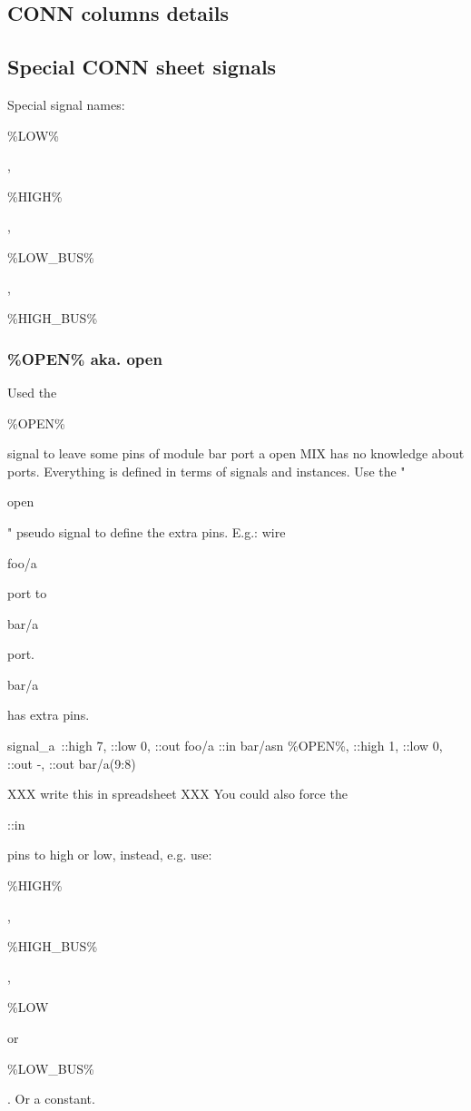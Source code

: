 \documentclass[a4paper,12pt]{article}
\begin{document}
\subsection{CONN columns details}

\subsection{Special CONN sheet signals}
Special signal names:\newline
\begin{tt}\%LOW\%\end{tt}, \begin{tt}\%HIGH\%\end{tt}, \begin{tt}\%LOW\_BUS\%\end{tt}, \begin{tt}\%HIGH\_BUS\%\end{tt}\newline

\subsubsection{\%OPEN\% aka. open}
Used the \begin{tt}\%OPEN\%\end{tt} signal to leave some pins of module bar port a open MIX has no knowledge about ports. Everything is defined in terms of signals and instances. Use the "\begin{tt}open\end{tt}" pseudo signal to define the extra pins.\newline
\newline
E.g.: wire \begin{tt}foo/a\end{tt} port to \begin{tt}bar/a\end{tt} port. \begin{tt}bar/a\end{tt} has extra pins.\newline
\newline
\begin{tt}signal\_a\, ::high 7, ::low 0, ::out foo/a ::in bar/asn\newline
\%OPEN\%, ::high 1, ::low 0, ::out -, ::out bar/a(9:8)\end{tt}\newline
\newline
XXX write this in spreadsheet XXX\newline
You could also force the \begin{tt}::in\end{tt} pins to high or low, instead, e.g. use:
\newline\begin{tt}\%HIGH\%\end{tt}, \begin{tt}\%HIGH\_BUS\%\end{tt}, \begin{tt}\%LOW\end{tt} or \begin{tt}\%LOW\_BUS\%\end{tt}. Or a constant.
\end{document}
